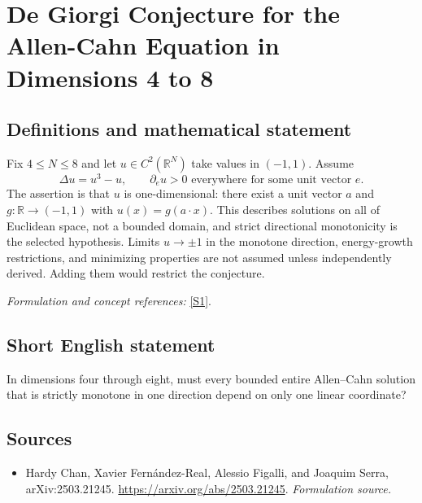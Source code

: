 \documentclass[11pt]{article}
\begin{document}
\section*{\texorpdfstring{De Giorgi Conjecture for the Allen-Cahn Equation in Dimensions 4 to 8}{De Giorgi Conjecture for the Allen-Cahn Equation in Dimensions 4 to 8}}\label{235}
\subsection{Definitions and mathematical statement}
Fix $4\le N\le8$ and let $u\in C^2({\mathbb{R}}^N)$ take values in $(-1,1)$. Assume
\[
 \Delta u=u^3-u,\qquad \partial_eu>0\text{ everywhere for some unit vector }e.
\]
The assertion is that $u$ is one-dimensional: there exist a unit vector $a$ and $g:{\mathbb{R}}\to(-1,1)$ with $u(x)=g(a\cdot x)$. This describes solutions on all of Euclidean space, not a bounded domain, and strict directional monotonicity is the selected hypothesis. Limits $u\to\pm1$ in the monotone direction, energy-growth restrictions, and minimizing properties are not assumed unless independently derived. Adding them would restrict the conjecture.
\par\smallskip\textit{Formulation and concept references:} \href{https://arxiv.org/abs/2503.21245}{[S1]}.

\subsection{Short English statement}
In dimensions four through eight, must every bounded entire Allen–Cahn solution that is strictly monotone in one direction depend on only one linear coordinate?
\subsection{Sources}
\begin{itemize}
\item[S1]Hardy Chan, Xavier Fernández-Real, Alessio Figalli, and Joaquim Serra, arXiv:2503.21245.
\url{https://arxiv.org/abs/2503.21245}.
\textit{Formulation source.}
\end{itemize}
\end{document}

